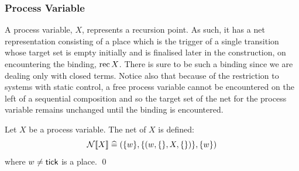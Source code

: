\subsubsection{Process Variable}
A process variable, $X$, represents a recursion point. As such, it has
a net representation consisting of a place which is the trigger of a
single transition whose target set is empty initially and 
is finalised later in the construction, on encountering the binding,
$\mathrm{rec\,} X$. There is sure to be such a binding since we are dealing only
with closed terms.  Notice also that because of the restriction to systems
with static control, a free process variable cannot be encountered on the left
of a sequential composition and so the target set of the net for the process
variable remains unchanged until the binding is encountered.
\begin{definition}
Let $X$ be a process variable. The net of $X$ is defined:
\[{\mathcal{N}[\![X]\!]} \mathrel{\widehat=} (\{{w}\},\{({w},\{\},X,\{\})\},\{{w}\}) \]
where ${w} \neq {\sf tick}$ is a place.
\qed
\end{definition}

